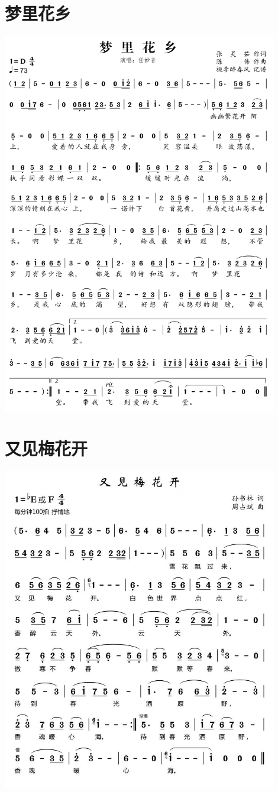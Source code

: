 \documentclass[cn,pad,twocol]{elegantbook}
\begin{document}
\section{梦里花乡} \includegraphics[width=0.9\textwidth]{rpi400/20210212梦里花乡.png}
\section{又见梅花开} \includegraphics[width=0.9\textwidth]{macos/20210208又见梅花开.jpg}
\end{document}
